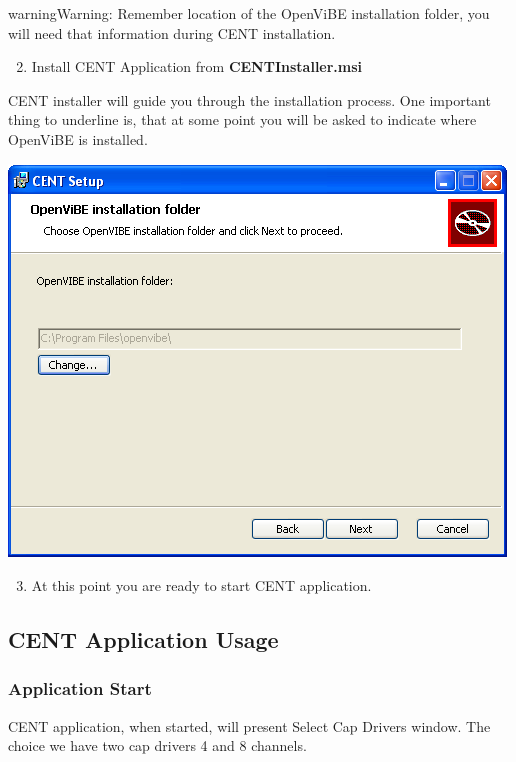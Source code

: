 \documentclass[letterpaper,10pt,english]{sphinxmanual}
\begin{document}
\begin{notice}{warning}{Warning:}
Remember location of the OpenViBE installation folder, you will need that information during CENT installation.
\end{notice}
\begin{enumerate}
\setcounter{enumi}{1}
\item {} 
Install CENT Application from \textbf{CENTInstaller.msi}

\end{enumerate}

CENT installer will guide you through the installation process. One important thing to underline is, that at some point you will be asked to indicate where OpenViBE is installed.

{\hfill\includegraphics{OpenVibeInstallationFolder.PNG}\hfill}
\begin{enumerate}
\setcounter{enumi}{2}
\item {} 
At this point you are ready to start CENT application.

\end{enumerate}


\subsection{\textbf{CENT Application Usage}}
\label{index:cent-application-usage}

\subsubsection{Application Start}
\label{index:application-start}
CENT application, when started, will present Select Cap Drivers window. The choice we have two cap drivers 4 and 8 channels.
\end{document}
